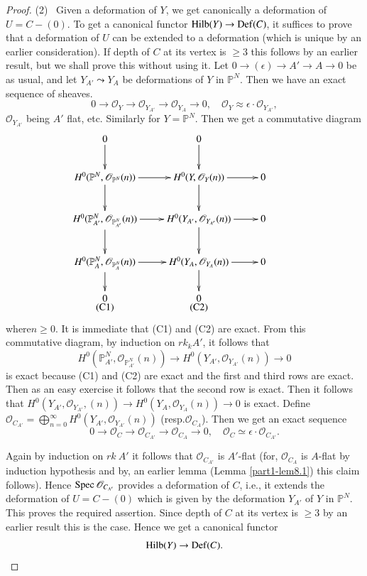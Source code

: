 {\begin{proof}
\medskip
(2)~ Given a deformation of $Y$, we get canonically a deformation of
$U=C-(0)$. To get a canonical functor $\operatorname{Hilb}(Y)\to \operatorname{Def}(C)$, it
suffices to prove that a deformation of $U$ can be extended to a
deformation (which is unique by an earlier consideration). If depth of
$C$ at its vertex is $\geq 3$ this follows by an earlier result, but
we shall prove this without using it. Let
$0\to (\epsilon)\to A'\to A\to 0$ be as usual, and let $Y_{A'}\leadsto
Y_{A}$ be deformations of $Y$ in $\mathbb{P}^{N}$. Then we have an
exact sequence of sheaves.
$$
0\to \mathscr{O}_{Y}\to \mathscr{O}_{Y_{A'}}\to \mathscr{O}_{Y_{A}}\to
0,\quad \mathscr{O}_{Y}\approx \epsilon\cdot \mathscr{O}_{Y_{A'}},
$$
$\mathscr{O}_{Y_{A'}}$ being $A'$ flat, etc. Similarly for
$Y=\mathbb{P}^{N}$. Then we get a commutative diagram
\[
\xymatrix{
  0\ar[d] & 0\ar[d] & & \\
H^{0}(\mathbb{P}^{N},\mathscr{O}_{\mathbb{P}^{N}}(n))\ar[d]\ar[r] &
H^{0}(Y,\mathscr{O}_{Y}(n))\ar[d]\ar[r] & 0\\
H^{0}(\mathbb{P}^{N}_{A'},\mathscr{O}_{\mathbb{P}^{N}_{A'}}(n))\ar[d]\ar[r]
& H^{0}(Y_{A'},\mathscr{O}_{Y_{A'}}(n))\ar[d]\ar[r] & 0\\
H^{0}(\mathbb{P}^{N}_{A},\mathscr{O}_{\mathbb{P}^{N}_{A}}(n))\ar[d]\ar[r]
& H^{0}(Y_{A},\mathscr{O}_{Y_{A}}(n))\ar[d]\ar[r] & 0\\
\overset{\displaystyle 0}{\rm(C1)} & \overset{\displaystyle 0}{\rm(C2)} & 
}
\]
where\pageoriginale $n\geq 0$. It is immediate that (C1) and (C2) are
exact. From this commutative diagram, by induction on $rk_{k}A'$, it
follows that
$$
H^{0}(\mathbb{P}^{N}_{A'},\mathscr{O}_{\mathbb{P}^{N}_{A'}}(n))\to
H^{0}(Y_{A'},\mathscr{O}_{Y_{A'}}(n))\to 0
$$
is exact because (C1) and (C2) are exact and the first and third rows
are exact. Then as an easy exercise it follows that the second row is
exact. Then it follows that $H^{0}(Y_{A'},\mathscr{O}_{Y_{A'}},(n))\to
H^{0}(Y_{A},\mathscr{O}_{Y_{A}}(n))\to 0$ is exact. Define
$\mathscr{O}_{C_{A'}}=\bigoplus\limits^{\infty}_{n=0}H^{0}(Y_{A'},\mathscr{O}_{Y_{A'}}(n))$
(resp.\@ $\mathscr{O}_{C_{A}}$). Then we get an exact sequence
$$
0\to \mathscr{O}_{C}\to \mathscr{O}_{C_{A'}}\to \mathscr{O}_{C_{A}}\to
0,\quad \mathscr{O}_{C}\simeq \epsilon\cdot \mathscr{O}_{C_{A'}}.
$$

Again by induction on $rk\ A'$ it follows that $\mathscr{O}_{C_{A'}}$
is $A'$-flat (for, $\mathscr{O}_{C_{A}}$ is $A$-flat by induction
hypothesis and by, an earlier lemma (Lemma \ref{part1-lem8.1}) this
claim follows). Hence $\operatorname{Spec} \mathscr{O}_{C_{A'}}$ provides a
deformation of $C$, i.e., it extends the deformation of $U=C-(0)$
which is given by the deformation $Y_{A'}$ of $Y$ in
$\mathbb{P}^{N}$. This proves the required assertion. Since depth of
$C$ at its vertex is $\geq 3$ by an earlier result this is the
case. Hence we get a canonical functor
$$
\operatorname{Hilb}(Y)\to \operatorname{Def}(C).
$$


\end{proof}}
